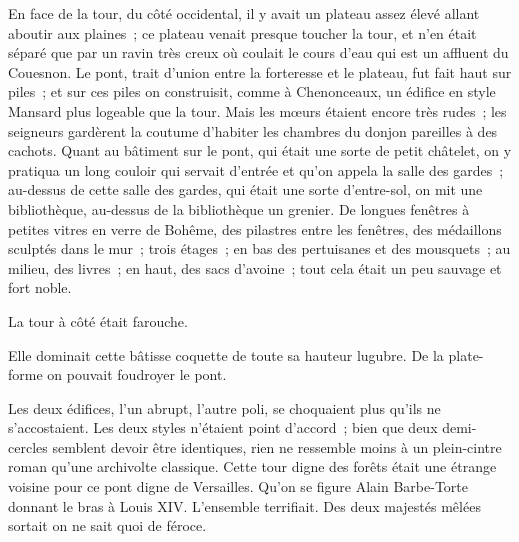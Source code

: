\documentclass[french,twoside]{book} %
\begin{document}
 En face de la tour, du côté occidental, il y avait un plateau assez élevé allant aboutir aux plaines ; ce plateau venait presque toucher la tour, et n’en était séparé que par un ravin très creux où coulait le cours d’eau qui est un affluent du Couesnon. Le pont, trait d’union entre la forteresse et le plateau, fut fait haut sur piles ; et sur ces piles on construisit, comme à Chenonceaux, un édifice en style Mansard plus logeable que la tour. Mais les mœurs étaient encore très rudes ; les seigneurs gardèrent la coutume d’habiter les chambres du donjon pareilles à des cachots. Quant au bâtiment sur le pont, qui était une sorte de petit châtelet, on y pratiqua un long couloir qui servait d’entrée et qu’on appela la salle des gardes ; au-dessus de cette salle des gardes, qui était une sorte d’entre-sol, on mit une bibliothèque, au-dessus de la bibliothèque un grenier. De longues fenêtres à petites vitres en verre de Bohême, des pilastres entre les fenêtres, des médaillons sculptés dans le mur ; trois étages ; en bas des pertuisanes et des mousquets ; au milieu, des livres ; en haut, des sacs d’avoine ; tout cela était un peu sauvage et fort noble.\par
La tour à côté était farouche.\par
Elle dominait cette bâtisse coquette de toute sa hauteur lugubre. De la plate-forme on pouvait foudroyer le pont.\par
Les deux édifices, l’un abrupt, l’autre poli, se choquaient plus qu’ils ne s’accostaient. Les deux styles n’étaient point d’accord ; bien que deux demi-cercles semblent devoir être identiques, rien ne ressemble  moins à un plein-cintre roman qu’une archivolte classique. Cette tour digne des forêts était une étrange voisine pour ce pont digne de Versailles. Qu’on se figure Alain Barbe-Torte donnant le bras à Louis XIV. L’ensemble terrifiait. Des deux majestés mêlées sortait on ne sait quoi de féroce.\par
\end{document}
